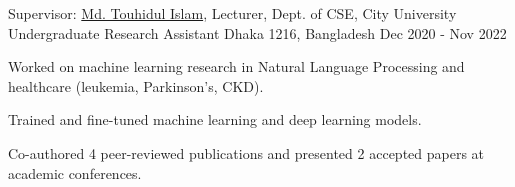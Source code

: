 \begin{cventries}



\cventry
  {Supervisor: \href{https://www.linkedin.com/in/touhid000/}{Md. Touhidul Islam}, Lecturer, Dept. of CSE, City University} %
  {Undergraduate Research Assistant} %
  {Dhaka 1216, Bangladesh} %
  {Dec 2020 - Nov 2022} %
  {
    \begin{cvitems} %
      \item{Worked on machine learning research in Natural Language Processing and healthcare (leukemia, Parkinson's, CKD).}
      \item{Trained and fine-tuned machine learning and deep learning models.}
      \item{Co-authored 4 peer-reviewed publications and presented 2 accepted papers at academic conferences.}
    \end{cvitems}
  }
  



\end{cventries}
